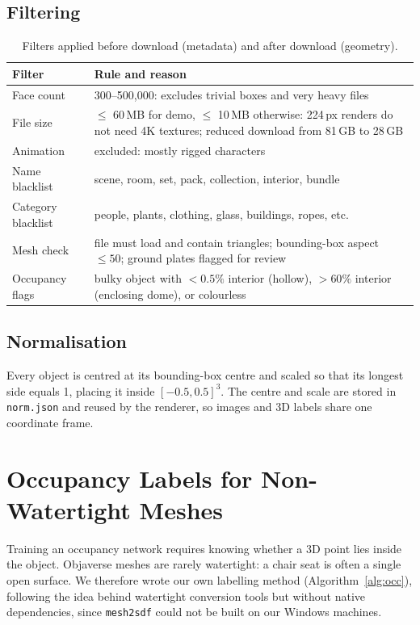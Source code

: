 \subsection{Filtering}
\begin{table}[H]
\centering
\caption{Filters applied before download (metadata) and after download (geometry).}
\label{tab:filters}
\small
\begin{tabularx}{\textwidth}{lX}
\toprule
Filter & Rule and reason \\
\midrule
Face count & 300--500{,}000: excludes trivial boxes and very heavy files \\
File size & $\le$ 60\,MB for demo, $\le$ 10\,MB otherwise: 224\,px renders do not need 4K textures; reduced download from 81\,GB to 28\,GB \\
Animation & excluded: mostly rigged characters \\
Name blacklist & scene, room, set, pack, collection, interior, bundle \\
Category blacklist & people, plants, clothing, glass, buildings, ropes, etc. \\
Mesh check & file must load and contain triangles; bounding-box aspect $\le 50$; ground plates flagged for review \\
Occupancy flags & bulky object with $<0.5\%$ interior (hollow), $>60\%$ interior (enclosing dome), or colourless \\
\bottomrule
\end{tabularx}
\end{table}

\subsection{Normalisation}
Every object is centred at its bounding-box centre and scaled so that its longest side equals 1, placing it inside $[-0.5, 0.5]^3$. The centre and scale are stored in \texttt{norm.json} and reused by the renderer, so images and 3D labels share one coordinate frame.

\section{Occupancy Labels for Non-Watertight Meshes}
Training an occupancy network requires knowing whether a 3D point lies inside the object. Objaverse meshes are rarely watertight: a chair seat is often a single open surface. We therefore wrote our own labelling method (Algorithm~\ref{alg:occ}), following the idea behind watertight conversion tools but without native dependencies, since \texttt{mesh2sdf} could not be built on our Windows machines.

